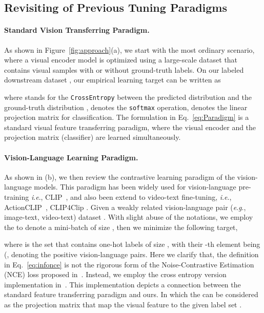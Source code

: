 \documentclass[letterpaper]{article} \usepackage{aaai23}  \usepackage{times}  \usepackage{helvet}  \usepackage{courier}  \usepackage[hyphens]{url}  \usepackage{graphicx} \urlstyle{rm} \def\UrlFont{\rm}  \usepackage{natbib}  \usepackage{caption} \frenchspacing  \setlength{\pdfpagewidth}{8.5in}  \setlength{\pdfpageheight}{11in}  \usepackage{algorithm}
\newcommand{\ie}{\textit{i}.\textit{e}.}
\newcommand{\eg}{\textit{e}.\textit{g}.}
\begin{document}
\subsection{Revisiting of Previous Tuning Paradigms}



\paragraph{Standard Vision Transferring Paradigm.} As shown in Figure~\ref{fig:approach}(a), we start with the most ordinary scenario, where a visual encoder model  is optimized using a large-scale dataset  that contains visual samples with or without ground-truth labels. On our labeled downstream dataset , our empirical learning target can be written as

where  stands for the \texttt{CrossEntropy} between the predicted distribution  and the ground-truth distribution ,  denotes the \texttt{softmax} operation,  denotes the linear projection matrix for classification. The formulation in Eq.~\ref{eq:Paradigm} is a standard visual feature transferring paradigm, where the visual encoder  and the projection matrix (classifier)  are learned simultaneously.

\paragraph{Vision-Language Learning Paradigm.}
As shown in (b), we then review the contrastive learning paradigm of the vision-language models. This paradigm has been widely used for vision-language pre-training \ie, CLIP~\cite{CLIP}, and also been extend to video-text fine-tuning, \ie, ActionCLIP~\cite{wang2021actionclip}, CLIP4Clip \cite{luo2022clip4clip}.
Given a weakly related vision-language pair (\eg, image-text, video-text) dataset . With slight abuse of the notations, we employ the  to denote a mini-batch of size , then we minimize the following target,

where  is the set that contains  one-hot labels of size , with their -th element being  (, denoting the positive vision-language pairs. Here we clarify that, the definition in Eq.~\ref{eq:infonce} is not the rigorous form of the Noise-Contrastive Estimation (NCE) loss proposed in~\cite{infonce}. Instead, we employ the cross entropy version implementation in~\cite{CLIP,chen2021empirical}. This implementation depicts a connection between the standard feature transferring paradigm and ours. In which the  can be considered as the projection matrix that map the visual feature  to the given label set .
\end{document}
